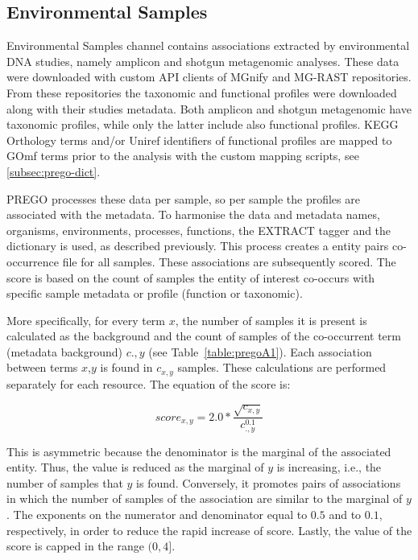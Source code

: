    \subsection{Environmental Samples}
   \label{subsec:prego-envsamples}

Environmental Samples channel contains associations extracted by environmental DNA studies, 
namely amplicon and shotgun metagenomic analyses. These data were downloaded with custom API clients
of MGnify \parencite{mitchell2020mgnify} and MG-RAST \parencite{wilke2015restful} repositories.
From these repositories the taxonomic and functional profiles were downloaded along with their 
studies metadata. Both amplicon and shotgun metagenomic have taxonomic profiles, while 
only the latter include also functional profiles.
KEGG Orthology terms and/or Uniref identifiers of functional profiles are mapped to GOmf terms 
prior to the analysis with the custom mapping scripts, see \ref{subsec:prego-dict}.

PREGO processes these data per sample, so per sample the profiles are associated with the metadata. 
To harmonise the data and metadata names, organisms, environments, processes, functions, the EXTRACT tagger and the dictionary is used, as described previously. 
This process creates a entity pairs co-occurrence file for all samples. 
These associations are subsequently scored. The score is based on the count of
samples the entity of interest co-occurs with specific sample metadata or profile (function or taxonomic). 

More specifically, for every term $x$, the number of samples it is present is calculated as the background 
and the count of samples of the co-occurrent term (metadata background) $c.,y$ (see Table~\ref{table:pregoA1}). 
Each association between terms $x$,$y$ is found in $c_{x,y}$ samples. 
These calculations are performed separately for each resource.
The equation of the score is:

\begin{equation}
   score_{x,y} = 2.0*{\frac{\sqrt{c_{x,y}}}{c_{.,y}^{0.1}}}
\end{equation}

This is asymmetric because the denominator is the marginal of the associated entity. 
Thus, the value is reduced as the marginal of $y$ is increasing, i.e., the number of samples that $y$ is found. 
Conversely, it promotes pairs of associations in which the number of samples of 
the association are similar to the marginal of $y$. 
The exponents on the numerator and denominator equal to $0.5$ and 
to $0.1$, respectively, in order to reduce the rapid increase of score.
Lastly, the value of the score is capped in the range $(0,4]$.

